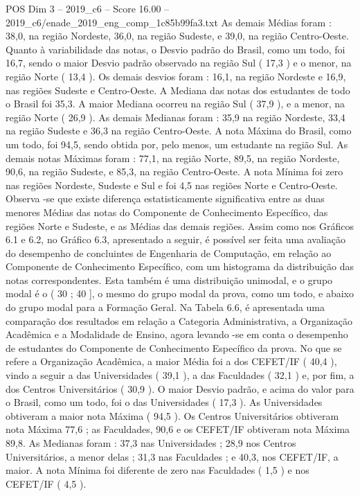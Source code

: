 \begin{textsample}{POS Dim 3 – 2019\_c6 – Score 16.00 – 2019\_c6/enade\_2019\_eng\_comp\_1c85b99fa3.txt}
As demais Médias foram : 38,0, na região Nordeste, 36,0, na região Sudeste, e 39,0, na região Centro-Oeste.
Quanto à variabilidade das notas, o Desvio padrão do Brasil, como um todo, foi 16,7, sendo o maior Desvio padrão observado na região Sul ( 17,3 ) e o menor, na região Norte ( 13,4 ).
Os demais desvios foram : 16,1, na região Nordeste e 16,9, nas regiões Sudeste e Centro-Oeste.
A Mediana das notas dos estudantes de todo o Brasil foi 35,3.
A maior Mediana ocorreu na região Sul ( 37,9 ), e a menor, na região Norte ( 26,9 ).
As demais Medianas foram : 35,9 na região Nordeste, 33,4 na região Sudeste e 36,3 na região Centro-Oeste.
A nota Máxima do Brasil, como um todo, foi 94,5, sendo obtida por, pelo menos, um estudante na região Sul.
As demais notas Máximas foram : 77,1, na região Norte, 89,5, na região Nordeste, 90,6, na região Sudeste, e 85,3, na região Centro-Oeste.
A nota Mínima foi zero nas regiões Nordeste, Sudeste e Sul e foi 4,5 nas regiões Norte e Centro-Oeste.
Observa -se que existe diferença estatisticamente significativa entre as duas menores Médias das notas do Componente de Conhecimento Específico, das regiões Norte e Sudeste, e as Médias das demais regiões.
Assim como nos Gráficos 6.1 e 6.2, no Gráfico 6.3, apresentado a seguir, é possível ser feita uma avaliação do desempenho de concluintes de Engenharia de Computação, em relação ao Componente de Conhecimento Específico, com um histograma da distribuição das notas correspondentes.
Esta também é uma distribuição unimodal, e o grupo modal é o ( 30 ; 40 ], o mesmo do grupo modal da prova, como um todo, e abaixo do grupo modal para a Formação Geral.
Na Tabela 6.6, é apresentada uma comparação dos resultados em relação a Categoria Administrativa, a Organização Acadêmica e a Modalidade de Ensino, agora levando -se em conta o desempenho de estudantes do Componente de Conhecimento Específico da prova.
No que se refere a Organização Acadêmica, a maior Média foi a dos CEFET/IF ( 40,4 ), vindo a seguir a das Universidades ( 39,1 ), a das Faculdades ( 32,1 ) e, por fim, a dos Centros Universitários ( 30,9 ).
O maior Desvio padrão, e acima do valor para o Brasil, como um todo, foi o das Universidades ( 17,3 ).
As Universidades obtiveram a maior nota Máxima ( 94,5 ).
Os Centros Universitários obtiveram nota Máxima 77,6 ; as Faculdades, 90,6 e os CEFET/IF obtiveram nota Máxima 89,8.
As Medianas foram : 37,3 nas Universidades ; 28,9 nos Centros Universitários, a menor delas ; 31,3 nas Faculdades ; e 40,3, nos CEFET/IF, a maior.
A nota Mínima foi diferente de zero nas Faculdades ( 1,5 ) e nos CEFET/IF ( 4,5 ).

\end{textsample}
